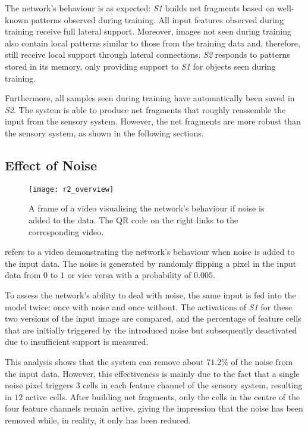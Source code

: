 The network's behaviour is as expected: \emph{S1} builds net fragments based on well-known patterns observed during training.
All input features observed during training receive full lateral support.
Moreover, images not seen during training also contain local patterns similar to those from the training data and, therefore, still receive local support through lateral connections.
\emph{S2} responds to patterns stored in its memory, only providing support to \emph{S1} for objects seen during training.

Furthermore, all samples seen during training have automatically been saved in \emph{S2}.
The system is able to produce net fragments that roughly reassemble the input from the sensory system.
However, the net fragments are more robust than the sensory system, as shown in the following sections.

\subsection{Effect of Noise}
%
\begin{figure}[h]
    \centering
    \texttt{[image: r2\_overview]}
    \caption[Video visualising the network's behaviour with noise in input]{A frame of a video visualising the network's behaviour if noise is added to the data. The QR code on the right links to the corresponding video.}
\end{figure}
%
 refers to a video demonstrating the network's behaviour when noise is added to the input data.
The noise is generated by randomly flipping a pixel in the input data from $0$ to $1$ or vice versa with a probability of $0.005$.

To assess the network's ability to deal with noise, the same input is fed into the model twice: once with noise and once without. The activations of \emph{S1} for these two versions of the input image are compared, and the percentage of feature cells that are initially triggered by the introduced noise but subsequently deactivated due to insufficient support is measured.

This analysis shows that the system can remove about $71.2\%$ of the noise from the input data. However, this effectiveness is mainly due to the fact that a single noise pixel triggers $3$ cells in each feature channel of the sensory system, resulting in $12$ active cells. After building net fragments, only the cells in the centre of the four feature channels remain active, giving the impression that the noise has been removed while, in reality, it only has been reduced.

